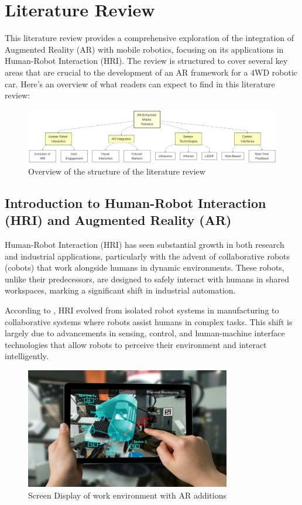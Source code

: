 \chapter{\label{ch:lit_review} Literature Review}

This literature review provides a comprehensive exploration of the integration of Augmented Reality (AR) with mobile robotics, focusing on its applications in Human-Robot Interaction (HRI). The review is structured to cover several key areas that are crucial to the development of an AR framework for a 4WD robotic car. Here's an overview of what readers can expect to find in this literature review:

\begin{figure}[ht]
    \centering
    \includegraphics[width=1\textwidth]{ch2/figs/lit_overview.png}
    \caption{Overview of the structure of the literature review}
    \label{fig:Lit_overview}
\end{figure}

\section{Introduction to Human-Robot Interaction (HRI) and Augmented Reality (AR)}

Human-Robot Interaction (HRI) has seen substantial growth in both research and industrial applications, particularly with the advent of collaborative robots (cobots) that work alongside humans in dynamic environments. These robots, unlike their predecessors, are designed to safely interact with humans in shared workspaces, marking a significant shift in industrial automation. 

According to \cite{Hentout2019}, HRI evolved from isolated robot systems in manufacturing to collaborative systems where robots assist humans in complex tasks. This shift is largely due to advancements in sensing, control, and human-machine interface technologies that allow robots to perceive their environment and interact intelligently.

\begin{figure}[ht]
    \centering
    \includegraphics[width=0.8\textwidth]{ch2/figs/image_overlay.png}
    \caption{Screen Display of work environment with AR additions}
    \label{fig:AR_work_overlay}
\end{figure}

